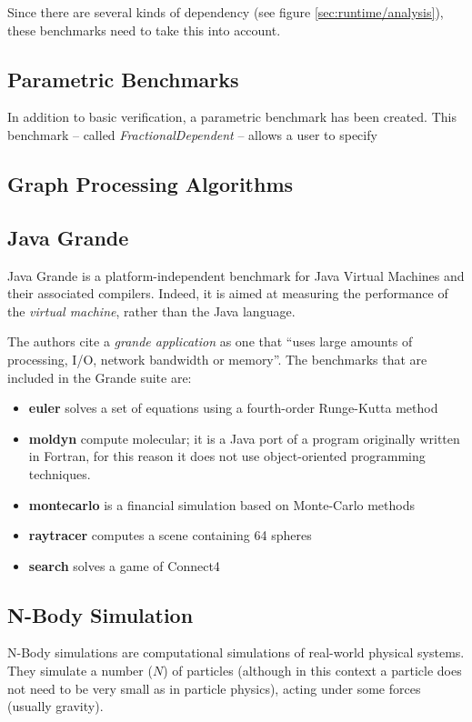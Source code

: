 	Since there are several kinds of dependency (see figure \ref{sec:runtime/analysis}), these benchmarks need to take this into account.
	
	\subsection{Parametric Benchmarks} \label{sec:methodology/benchmarks/parametric}
	In addition to basic verification, a parametric benchmark has been created. This benchmark -- called \textit{FractionalDependent} -- allows a user to specify 
	
	\subsection{Graph Processing Algorithms} \label{sec:methodology/benchmarks/graphs}
	
	\subsection{Java Grande} \label{sec:methodology/benchmarks/grande}
	Java Grande \citep{Smith2001,Bull2001} is a platform-independent benchmark for Java Virtual Machines and their associated compilers. Indeed, it is aimed at measuring the performance of the \emph{virtual machine}, rather than the Java language.
	
	The authors cite a \textit{grande application} as one that ``uses large amounts of processing, I/O, network bandwidth or memory''. The benchmarks that are included in the Grande suite are:
	
	\begin{itemize}
		\item \textbf{euler} solves a set of equations using a fourth-order Runge-Kutta method
		\item \textbf{moldyn} compute molecular; it is a Java port of a program originally written in Fortran, for this reason it does not use object-oriented programming techniques.
		\item \textbf{montecarlo} is a financial simulation based on Monte-Carlo methods
		\item \textbf{raytracer} computes a scene containing 64 spheres
		\item \textbf{search} solves a game of Connect4
	\end{itemize}
	
	\subsection{N-Body Simulation} \label{sec:methodology/benchmarks/nbody}
	N-Body simulations \citep{Trenti2008} are computational simulations of real-world physical systems. They simulate a number ($N$) of particles (although in this context a particle does not need to be very small as in particle physics), acting under some forces (usually gravity).
	
